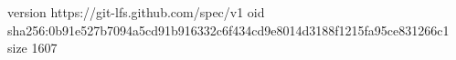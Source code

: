 version https://git-lfs.github.com/spec/v1
oid sha256:0b91e527b7094a5cd91b916332c6f434cd9e8014d3188f1215fa95ce831266c1
size 1607
